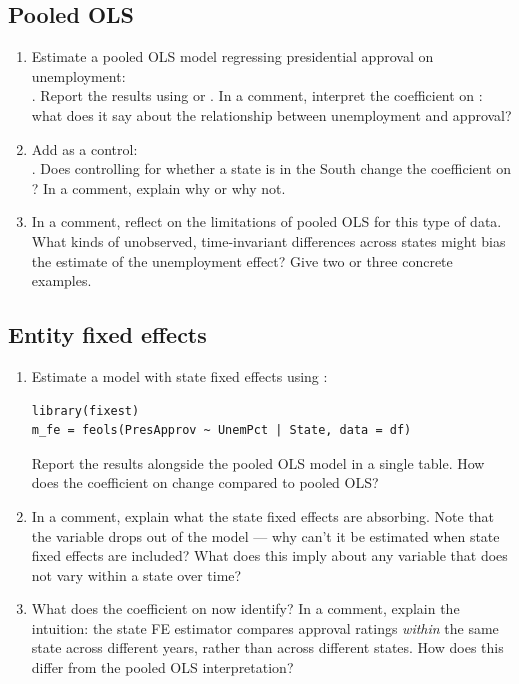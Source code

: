 \subsection{Pooled OLS}

\begin{enumerate}[label=\alph*)]
  \item Estimate a pooled OLS model regressing presidential approval on unemployment: \\. Report the results using  or . In a comment, interpret the coefficient on : what does it say about the relationship between unemployment and approval?
  \item Add  as a control: \\. Does controlling for whether a state is in the South change the coefficient on ? In a comment, explain why or why not.
  \item In a comment, reflect on the limitations of pooled OLS for this type of data. What kinds of unobserved, time-invariant differences across states might bias the estimate of the unemployment effect? Give two or three concrete examples.
\end{enumerate}

\subsection{Entity fixed effects}

\begin{enumerate}[label=\alph*)]
  \item Estimate a model with state fixed effects using :
  \begin{lstlisting}
library(fixest)
m_fe = feols(PresApprov ~ UnemPct | State, data = df)
  \end{lstlisting}
  Report the results alongside the pooled OLS model in a single  table. How does the coefficient on  change compared to pooled OLS?
  \item In a comment, explain what the state fixed effects are absorbing. Note that the  variable drops out of the model --- why can't it be estimated when state fixed effects are included? What does this imply about any variable that does not vary within a state over time?
  \item What does the coefficient on  now identify? In a comment, explain the intuition: the state FE estimator compares approval ratings \textit{within} the same state across different years, rather than across different states. How does this differ from the pooled OLS interpretation?
\end{enumerate}

